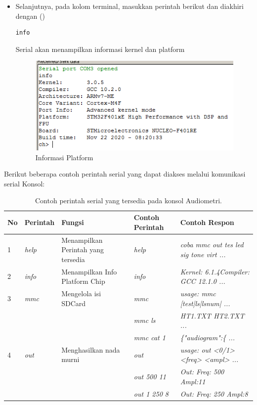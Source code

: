 \documentclass{article}
\begin{document}
\begin{enumerate}
\begin{itemize}
			\item Selanjutnya, pada kolom terminal,
			masukkan perintah berikut dan diakhiri dengan (\keys{\return})
			\begin{verbatim}
info
			\end{verbatim}
			Serial akan menampilkan informasi kernel dan platform
			\begin{figure}[H]
				\centering
				\includegraphics[width=300pt]{images/software/hercules_text}
				\caption{Informasi Platform}
			\end{figure}
		\end{itemize}
		
	\end{enumerate}
	
	Berikut beberapa contoh perintah serial yang dapat diakses melalui komunikasi serial Konsol:
	
	\begin{table}[H]
		\renewcommand{\tablename}{Tabel}
		\centering
		\caption{Contoh perintah serial yang tersedia pada konsol Audiometri. \label{table:serial-code}}
		\begin{tabular}{| p{} | p{} | p{} | p{} | p{} |}
			\hline
			\textbf{No} & \textbf{Perintah} & \textbf{Fungsi} & \textbf{Contoh Perintah} & \textbf{Contoh Respon} \\
			\hline
			1 & \textit{help} & Menampilkan Perintah yang tersedia & \textit{help} & \textit{coba mmc out tes led sig tone virt ...} \\
			\hline
			2 & \textit{info} & Menampilkan Info Platform Chip & \textit{info} & \textit{Kernel: 6.1.4Compiler: GCC 12.1.0 ...} \\
			\hline
			3 & \textit{mmc} & Mengelola isi SDCard & \textit{mmc} & \textit{usage: mmc [test|ls|lsnum| ...} \\
			& & & \textit{mmc ls} & \textit{HT1.TXT HT2.TXT ...} \\
			& & & \textit{mmc cat 1} & \textit{\{"audiogram":\{ ...} \\
			\hline
			4 & \textit{out} & Menghasilkan nada murni &  \textit{out} & \textit{usage: out <0/1> <freq> <ampl> ...} \\
			& & & \textit{out 500 11} & \textit{Out: Freq:  500 Ampl:11} \\
			& & & \textit{out 1 250 8} & \textit{Out: Freq:  250 Ampl:8} \\
			\hline
		\end{tabular}
	\end{table}
	
\end{document}
